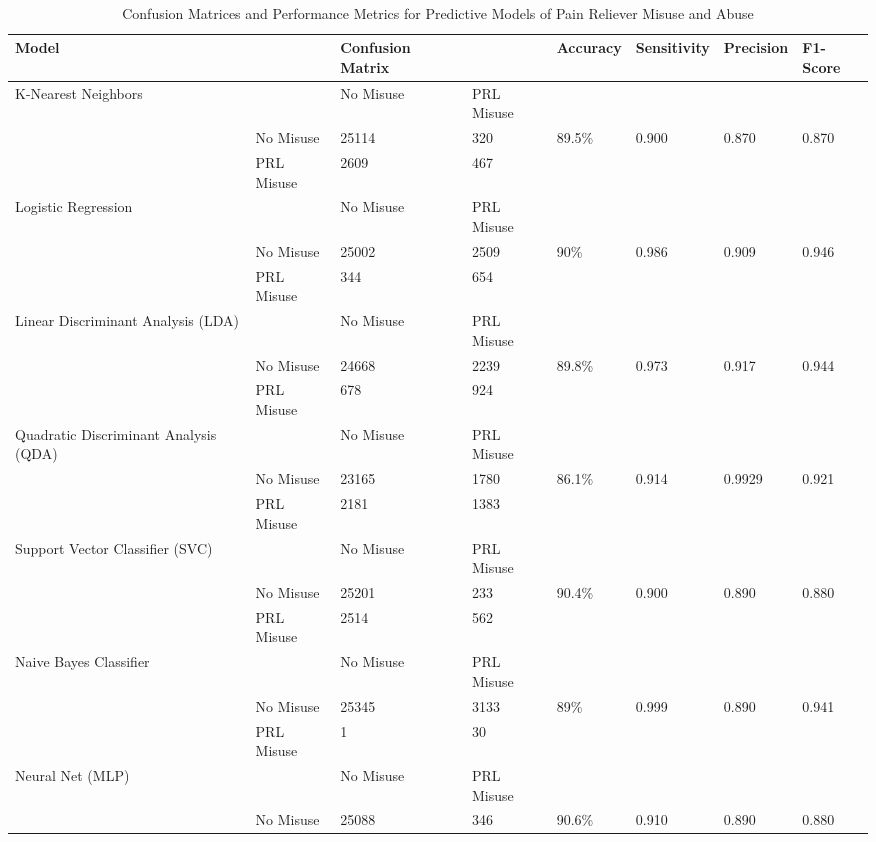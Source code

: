 \\\documentclass[sigconf]{acmart}
\begin{document}
 

 
 
\begin{table*}[ht]
  \caption{Confusion Matrices and Performance Metrics for Predictive Models of 
  Pain Reliever Misuse and Abuse}
  \label{tab:freq}
  \begin{tabular}{llllllll}
    \toprule
    Model& & Confusion Matrix & & Accuracy & Sensitivity & Precision & F1-Score \\
    \midrule
    K-Nearest Neighbors & & No Misuse & PRL Misuse &  &  &  & \\
     & No Misuse & 25114 & 320 & 89.5\% & 0.900 & 0.870 & 0.870 \\
     & PRL Misuse & 2609 & 467 &  &  &  & \\
    \midrule
    Logistic Regression & & No Misuse & PRL Misuse &  &  &  & \\
     & No Misuse & 25002 & 2509 & 90\% & 0.986 & 0.909 & 0.946 \\
     & PRL Misuse & 344 & 654 &  &  &  & \\
    \midrule
    Linear Discriminant Analysis (LDA) & & No Misuse & PRL Misuse &  &  &  & \\
     & No Misuse & 24668 & 2239 & 89.8\% & 0.973 & 0.917 & 0.944 \\
     & PRL Misuse & 678 & 924 &  &  &  & \\
    \midrule
    Quadratic Discriminant Analysis (QDA) & & No Misuse & PRL Misuse &  &  &  & \\
     & No Misuse & 23165 & 1780 & 86.1\% & 0.914 & 0.9929 & 0.921 \\
     & PRL Misuse & 2181 & 1383 &  &  &  & \\
    \midrule
    Support Vector Classifier (SVC) & & No Misuse & PRL Misuse &  &  &  & \\
     & No Misuse & 25201 & 233 & 90.4\% & 0.900 & 0.890 & 0.880 \\
     & PRL Misuse & 2514 & 562 &  &  &  & \\
    \midrule
    Naive Bayes Classifier & & No Misuse & PRL Misuse &  &  &  & \\
     & No Misuse & 25345 & 3133 & 89\% & 0.999 & 0.890 & 0.941 \\
     & PRL Misuse & 1 & 30 &  &  &  & \\
    \midrule
    Neural Net  (MLP) & & No Misuse & PRL Misuse &  &  &  & \\
     & No Misuse & 25088 & 346 & 90.6\% & 0.910 & 0.890 & 0.880 \\

\end{tabular}
\end{table*}
\end{document}
